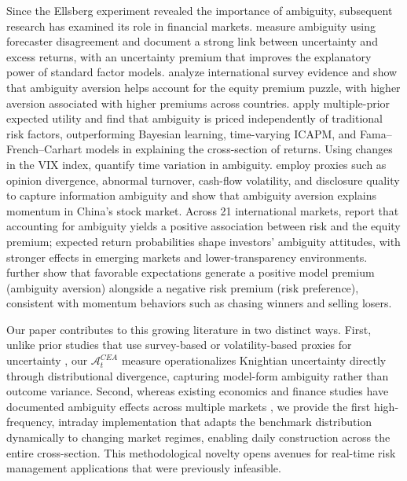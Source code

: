 \documentclass[preprint,12pt,authoryear]{elsarticle}
\renewcommand{\textcolor}[2]{\begingroup\color{#1}#2\endgroup}
\begin{document}
Since the Ellsberg experiment revealed the importance of ambiguity, subsequent research has examined its role in financial markets. \citet{anderson2009} measure ambiguity using forecaster disagreement and document a strong link between uncertainty and excess returns, with an uncertainty premium that improves the explanatory power of standard factor models. \citet{rieger2012} analyze international survey evidence and show that ambiguity aversion helps account for the equity premium puzzle, with higher aversion associated with higher premiums across countries. \citep{ariel2014} apply multiple-prior expected utility and find that ambiguity is priced independently of traditional risk factors, outperforming Bayesian learning, time-varying ICAPM, and Fama–French–Carhart models in explaining the cross-section of returns. Using changes in the VIX index, \citep{williams2015} quantify time variation in ambiguity. \cite{xu2016} employ proxies such as opinion divergence, abnormal turnover, cash-flow volatility, and disclosure quality to capture information ambiguity and show that ambiguity aversion explains momentum in China's stock market. Across 21 international markets, \cite{kim2021} report that accounting for ambiguity yields a positive association between risk and the equity premium; expected return probabilities shape investors' ambiguity attitudes, with stronger effects in emerging markets and lower-transparency environments. \cite{hu2022} further show that favorable expectations generate a positive model premium (ambiguity aversion) alongside a negative risk premium (risk preference), consistent with momentum behaviors such as chasing winners and selling losers.

\textcolor{red}{Our paper contributes to this growing literature in two distinct ways. First, unlike prior studies that use survey-based or volatility-based proxies for uncertainty \citep{xu2016,kim2021}, our $\mathcal{A}^{CEA}_t$ measure operationalizes Knightian uncertainty directly through distributional divergence, capturing model-form ambiguity rather than outcome variance. Second, whereas existing economics and finance studies have documented ambiguity effects across multiple markets \citep{doi:10.1093/oep/gpae004,doi:10.1007/s10479-021-04314-7}, we provide the first high-frequency, intraday implementation that adapts the benchmark distribution dynamically to changing market regimes, enabling daily construction across the entire cross-section. This methodological novelty opens avenues for real-time risk management applications that were previously infeasible.}
\end{document}
